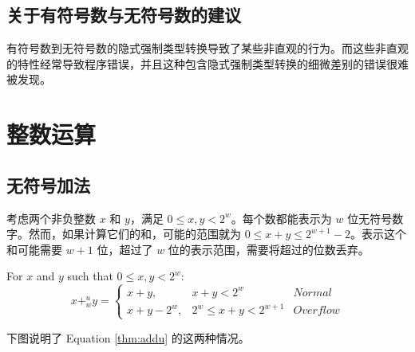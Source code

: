 \subsection{关于有符号数与无符号数的建议}

有符号数到无符号数的隐式强制类型转换导致了某些非直观的行为。而这些非直观的特性经常导致程序错误，并且这种包含隐式强制类型转换的细微差别的错误很难被发现。

\section{整数运算}

\subsection{无符号加法}

考虑两个非负整数 $x$ 和 $y$，满足 $0 \leq x, y < 2^w$。每个数都能表示为 $w$ 位无符号数字。然而，如果计算它们的和，可能的范围就为 $0 \leq x + y \leq 2^{w+1} - 2$。表示这个和可能需要 $w+1$ 位，超过了 $w$ 位的表示范围，需要将超过的位数丢弃。

\begin{theorem}
    For $x$ and $y$ such that $0 \leq x, y < 2^w$:
    \begin{equation}
        x +_w^u y = \left\{
        \begin{array}{lll}
            x + y, & x + y < 2^w & Normal \\
            x + y - 2^w, & 2^w \leq x+y < 2^{w+1} & Overflow
        \end{array}
        \right.
        \label{thm:addu}
    \end{equation}
\end{theorem}

下图说明了 Equation \eqref{thm:addu} 的这两种情况。

